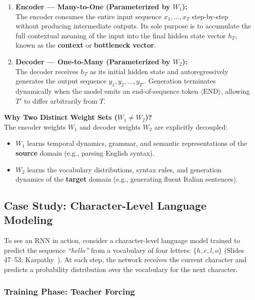 \begin{enumerate}[leftmargin=*]
    \item \textbf{Encoder --- Many-to-One (Parameterized by $W_1$):} \\
    The encoder consumes the entire input sequence $x_1, \dots, x_T$ step-by-step without producing intermediate outputs. Its sole purpose is to accumulate the full contextual meaning of the input into the final hidden state vector $h_T$, known as the \textbf{context} or \textbf{bottleneck vector}.
    \item \textbf{Decoder --- One-to-Many (Parameterized by $W_2$):} \\
    The decoder receives $h_T$ as its initial hidden state and autoregressively generates the output sequence $y_1, y_2, \dots, y_{T'}$. Generation terminates dynamically when the model emits an end-of-sequence token $\langle\text{END}\rangle$, allowing $T'$ to differ arbitrarily from $T$.
\end{enumerate}

\begin{keywordbox}
\textbf{Why Two Distinct Weight Sets ($W_1 \neq W_2$)?} \\
The encoder weights $W_1$ and decoder weights $W_2$ are explicitly decoupled:
\begin{itemize}[nosep, leftmargin=*]
    \item $W_1$ learns temporal dynamics, grammar, and semantic representations of the \textbf{source} domain (e.g., parsing English syntax).
    \item $W_2$ learns the vocabulary distributions, syntax rules, and generation dynamics of the \textbf{target} domain (e.g., generating fluent Italian sentences).
\end{itemize}
\end{keywordbox}

\subsection{Case Study: Character-Level Language Modeling}

To see an RNN in action, consider a character-level language model trained to predict the sequence \textit{``hello''} from a vocabulary of four letters: $\{h, e, l, o\}$ (Slides 47--53; Karpathy~\cite{karpathy2015unreasonable}). At each step, the network receives the current character and predicts a probability distribution over the vocabulary for the next character.

\subsubsection{Training Phase: Teacher Forcing}

